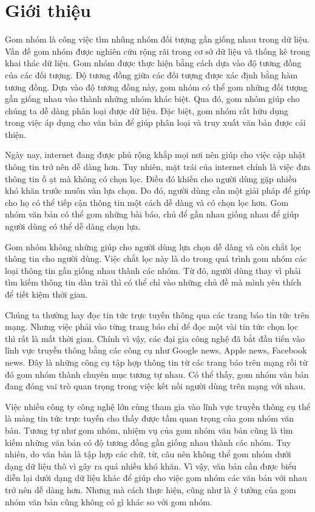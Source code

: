 \chapter{Giới thiệu}
\label{Chapter1}

Gom nhóm là công việc tìm nhũng nhóm đối tượng gần giống nhau trong dữ liệu.
Vấn đề gom nhóm được nghiên cứu rộng rãi trong cơ sở dữ liệu và thống kê trong khai thác dữ liệu.
Gom nhóm được thực hiện bằng cách dựa vào độ tương đồng của các đối tượng.
Độ tương đồng giữa các đối tượng được xác định bằng hàm tương đồng.
Dựa vào độ tương đồng này, gom nhóm có thể gom những đối tượng gần giống nhau vào thành những nhóm khác biệt.
Qua đó, gom nhóm giúp cho chúng ta dễ dàng phân loại được dữ liệu.
Đặc biệt, gom nhóm rất hữu dụng trong việc áp dụng cho văn bản để giúp phân loại và truy xuất văn bản được cải thiện.

Ngày nay, internet đang được phủ rộng khắp mọi nơi nên giúp cho việc cập nhật thông tin trở nên dễ dàng hơn.
Tuy nhiên, mặt trái của internet chính là việc đưa thông tin ồ ạt mà không có chọn lọc.
Điều đó khiến cho người dùng gặp nhiều khó khăn trước muôn vàn lựa chọn.
Do đó, người dùng cần một giải pháp để giúp cho họ có thể tiếp cận thông tin một cách dễ dàng và có chọn lọc hơn.
Gom nhóm văn bản có thể gom những bài báo, chủ để gần nhau giống nhau để giúp người dùng có thể dễ dàng chọn lựa.

Gom nhóm không những giúp cho người dùng lựa chọn dễ dàng và còn chắt lọc thông tin cho người dùng.
Việc chắt lọc này là do trong quá trình gom nhóm các loại thông tin gần giống nhau thành các nhóm.
Từ đó, người dùng thay vì phải tìm kiếm thông tin dàn trải thì có thể chỉ vào những chủ đề mà mình yêu thích để tiết kiệm thời gian.

Chúng ta thường hay đọc tin tức trực tuyến thông qua các trang báo tin tức trên mạng.
Nhưng việc phải vào từng trang báo chỉ để đọc một vài tin tức chọn lọc thì rất là mất thời gian.
Chính vì vậy, các đại gia công nghệ đã bắt đầu tiến vào lĩnh vực truyền thông bằng các công cụ như Google news, Apple news, Facebook news. 
Đây là những công cụ tập hợp thông tin từ các trang báo trên mạng rồi từ đó gom nhóm thành chuyên mục tương tự nhau.
Có thể thấy, gom nhóm văn bản đang đóng vai trò quan trọng trong việc kết nối người dùng trên mạng với nhau.

Việc nhiều công ty công nghệ lớn cùng tham gia vào lĩnh vực truyền thông cụ thể là mảng tin tức trực tuyến cho thấy được tầm quan trọng của gom nhóm văn bản.
Tương tự như gom nhóm, nhiệm vụ của gom nhóm văn bản cũng là tìm kiếm những văn bản có độ tương đồng gần giống nhau thành các nhóm.
Tuy nhiên, do văn bản là tập hợp các chữ, từ, câu nên không thể gom nhóm dưới dạng dữ liệu thô vì gây ra quá nhiều khó khăn.
Vì vậy, văn bản cần được biểu diễn lại dưới dạng dữ liệu khác để giúp cho việc gom nhóm các văn bản với nhau trở nên dễ dàng hơn.
Nhưng mà cách thực hiện, cũng như là ý tưởng của gom nhóm văn bản cũng không có gì khác so với gom nhóm.

